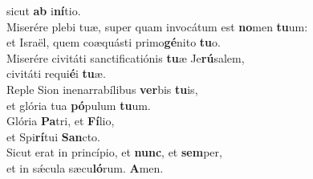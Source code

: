 \oddverse sicut \textbf{ab} i\textbf{ní}tio.\\
\evenverse Miserére plebi tuæ, super quam invocátum est \textbf{no}men \textbf{tu}um:~\*\\
\evenverse et Israël, quem coæquásti primo\textbf{gé}nito \textbf{tu}o.\\
\oddverse Miserére civitáti sanctificatiónis \textbf{tu}æ Je\textbf{rú}salem,~\*\\
\oddverse civitáti requi\textbf{é}i \textbf{tu}æ.\\
\evenverse Reple Sion inenarrabílibus \textbf{ver}bis \textbf{tu}is,~\*\\
\evenverse et glória tua \textbf{pó}pulum \textbf{tu}um.\\
\oddverse Glória \textbf{Pa}tri, et \textbf{Fí}lio,~\*\\
\oddverse et Spi\textbf{rí}tui \textbf{San}cto.\\
\evenverse Sicut erat in princípio, et \textbf{nunc}, et \textbf{sem}per,~\*\\
\evenverse et in sǽcula sæcu\textbf{ló}rum. \textbf{A}men.\\
